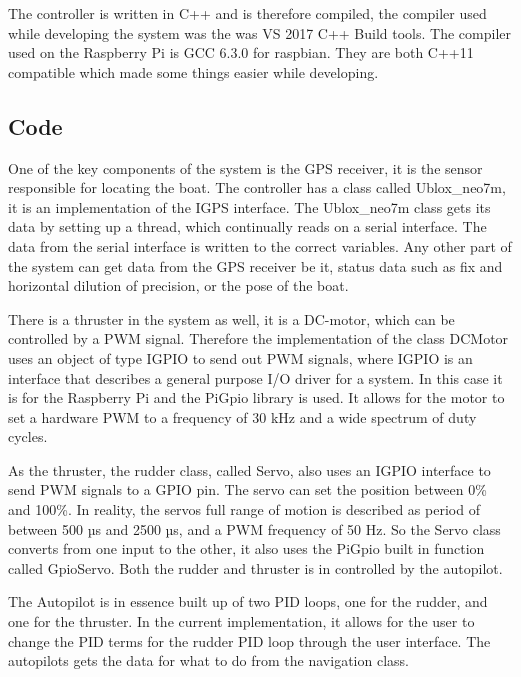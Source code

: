The controller is written in C++ and is therefore compiled, the compiler used while developing the system was the was VS 2017 C++ Build tools\cite{VC-2017}. The compiler used on the Raspberry Pi is GCC 6.3.0 for raspbian\cite{GCC}. They are both C++11 compatible which made some things easier while developing. 

\subsection{Code}

One of the key components of the system is the GPS receiver, it is the sensor responsible for locating the boat. The controller has a class called Ublox\_neo7m, it is an implementation of the IGPS interface. The Ublox\_neo7m class gets its data by setting up a thread, which continually reads on a serial interface. The data from the serial interface is written to the correct variables. Any other part of the system can get data from the GPS receiver be it, status data such as fix and horizontal dilution of precision, or the pose of the boat. 

There is a thruster in the system as well, it is a DC-motor, which can be controlled by a PWM signal. Therefore the implementation of the class DCMotor uses an object of type IGPIO to send out PWM signals, where IGPIO is an interface that describes a general purpose I/O driver for a system. In this case it is for the Raspberry Pi and the PiGpio library is used\cite{pigpio}. It allows for the motor to set a hardware PWM to a frequency of 30 kHz and a wide spectrum of duty cycles.

As the thruster, the rudder class, called Servo, also uses an IGPIO interface to send PWM signals to a GPIO pin. The servo can set the position between 0\% and 100\%. In reality, the servos full range of motion is described as period of between 500 µs and 2500 µs, and a PWM frequency of 50 Hz. So the Servo class converts from one input to the other, it also uses the PiGpio built in function called GpioServo. Both the rudder and thruster is in controlled by the autopilot.

The Autopilot is in essence built up of two PID loops, one for the rudder, and one for the thruster. In the current implementation, it allows for the user to change the PID terms for the rudder PID loop through the user interface. The autopilots gets the data for what to do from the navigation class.

